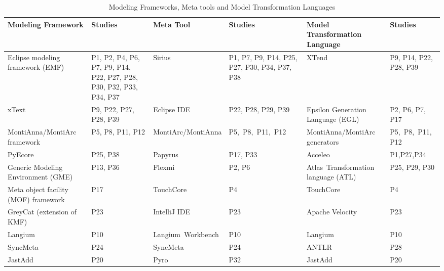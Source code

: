 \begin{table}[htbp]
\centering
\caption{Modeling Frameworks, Meta tools and Model Transformation Languages}
\footnotesize
        \begin{tabular}{p{2.6cm} p{2.8cm} | p{2.4cm} p{2.1cm} | p{2.5cm} p{1.5cm} }
        \hline
       \TBstrut  \textbf{Modeling Framework} \TBstrut  & \textbf{Studies} & \textbf{Meta Tool} & \textbf{Studies} & \textbf{Model Transformation Language } & \textbf{Studies}   \TBstrut \\
       
            \hline
            \TBstrut Eclipse modeling framework (EMF) \TBstrut	& P1, P2, P4, P6, P7, P9, P14, P22, P27, P28, P30, P32, P33, P34, P37 & Sirius & P1, P7, P9, P14, P25, P27, P30, P34, P37, P38 & XTend & P9, P14, P22, P28, P39\TBstrut \\

             xText \TBstrut	& P9, P22, P27, P28, P39 & Eclipse IDE  & P22, P28, P29, P39  &Epsilon Generation Language (EGL)  & P2, P6, P7, P17   \TBstrut \\
       
           \TBstrut MontiAnna/MontiArc framework \TBstrut	& P5, P8, P11, P12 & MontiArc/MontiAnna & \mbox{P5, P8, P11, P12} & MontiAnna/MontiArc generators  & \mbox{P5, P8, P11,} P12 \TBstrut \\

            \TBstrut PyEcore 	& P25, P38 & Papyrus & P17, P33 &  Acceleo & P1,P27,P34 \\

            Generic Modeling Environment (GME) 	& P13, P36 \TBstrut & Flexmi  & P2, P6 & \mbox{Atlas Transformation} language (ATL) & P25, P29, P30\TBstrut\\


            \TBstrut Meta object facility (MOF) framework  \TBstrut	& P17 &  TouchCore  & P4 & TouchCore & P4 \TBstrut \\


             \TBstrut GreyCat (extension of KMF)	& P23 & IntelliJ IDE  & P23 & Apache Velocity & P23 \TBstrut \\
                 
              Langium  \TBstrut	& P10 & \mbox{Langium Workbench} & P10 & Langium  & P10 \TBstrut \\            SyncMeta \TBstrut	& P24 &  SyncMeta  & P24 & ANTLR & P28 \TBstrut \\
                  
            JastAdd \TBstrut	& P20 & Pyro  & P32 & JastAdd  & P20 \TBstrut \\
             


\end{tabular}
\end{table}
